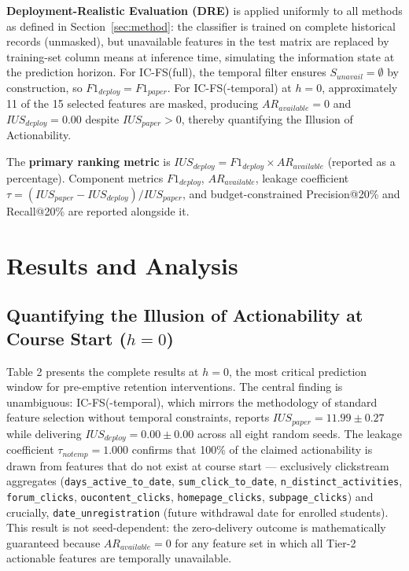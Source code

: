 \documentclass[a4paper,fleqn]{cas-sc}
\begin{document}
\textbf{Deployment-Realistic Evaluation (DRE)} is applied uniformly to all methods
as defined in Section~\ref{sec:method}: the classifier is trained on complete
historical records (unmasked), but unavailable features in the test matrix are
replaced by training-set column means at inference time, simulating the
information state at the prediction horizon.
For IC-FS(full), the temporal filter ensures $S_{unavail} = \emptyset$ by
construction, so $F1_{deploy} = F1_{paper}$.
For IC-FS(-temporal) at $h=0$, approximately 11 of the 15 selected features
are masked, producing $AR_{available} = 0$ and $IUS_{deploy} = 0.00$ despite
$IUS_{paper} > 0$, thereby quantifying the Illusion of Actionability.

The \textbf{primary ranking metric} is $IUS_{deploy} = F1_{deploy} \times AR_{available}$
(reported as a percentage). Component metrics $F1_{deploy}$, $AR_{available}$,
leakage coefficient $\tau = (IUS_{paper} - IUS_{deploy})/IUS_{paper}$,
and budget-constrained Precision@20\% and Recall@20\% are reported alongside it.
\section{Results and Analysis}
\label{sec:results}

\subsection{Quantifying the Illusion of Actionability at Course Start ($h=0$)}

Table 2 presents the complete results at $h=0$, the most critical prediction window for pre-emptive retention interventions. The central finding is unambiguous: IC-FS(-temporal), which mirrors the methodology of standard feature selection without temporal constraints, reports $IUS_{paper} = 11.99 \pm 0.27$ while delivering $IUS_{deploy} = 0.00 \pm 0.00$ across all eight random seeds. The leakage coefficient $\tau_{notemp} = 1.000$ confirms that 100\% of the claimed actionability is drawn from features that do not exist at course start --- exclusively clickstream aggregates (\texttt{days\_active\_to\_date}, \texttt{sum\_click\_to\_date}, \texttt{n\_distinct\_activities}, \texttt{forum\_clicks}, \texttt{oucontent\_clicks}, \texttt{homepage\_clicks}, \texttt{subpage\_clicks}) and crucially, \texttt{date\_unregistration} (future withdrawal date for enrolled students). This result is not seed-dependent: the zero-delivery outcome is mathematically guaranteed because $AR_{available} = 0$ for any feature set in which all Tier-2 actionable features are temporally unavailable.
\end{document}
